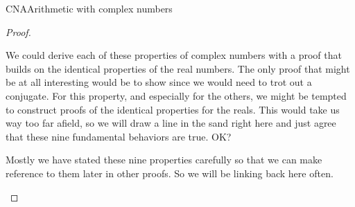 \begin{subsect}{CNA}{Arithmetic with complex numbers}
\begin{proof}
\begin{para}We could derive each of these properties of complex numbers with a proof that builds on the identical properties of the real numbers.  The only proof that might be at all interesting would be to show  since we would need to trot out a conjugate.  For this property, and especially for the others, we might be tempted to construct proofs of the identical properties for the reals.  This would take us way too far afield, so we will draw a line in the sand right here and just agree that these nine fundamental behaviors are true.  OK?\end{para}
%
\begin{para}Mostly we have stated these nine properties carefully so that we can make reference to them later in other proofs.  So we will be linking back here often.\end{para}
%
\end{proof}
%
\end{subsect}
%
